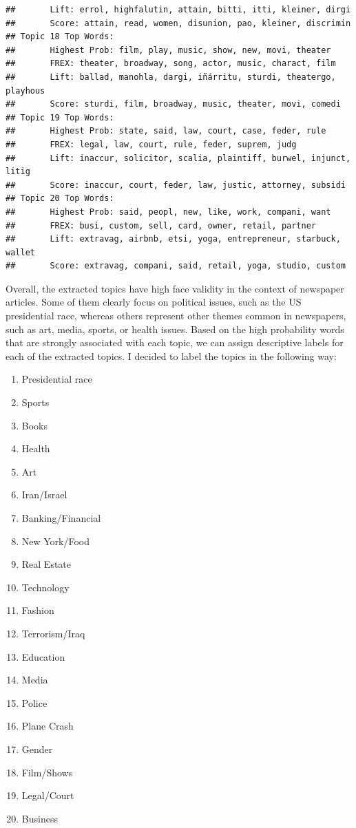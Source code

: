 \documentclass[12pt]{article}\usepackage[]{graphicx}\usepackage[]{color}
\makeatletter
\newenvironment{kframe}{%
 \def\at@end@of@kframe{}%
 \ifinner\ifhmode%
  \def\at@end@of@kframe{\end{minipage}}%
  \begin{minipage}{\columnwidth}%
 \fi\fi%
 \def\FrameCommand##1{\hskip\@totalleftmargin \hskip-\fboxsep
 \colorbox{shadecolor}{##1}\hskip-\fboxsep
     \hskip-\linewidth \hskip-\@totalleftmargin \hskip\columnwidth}%
 \MakeFramed {\advance\hsize-\width
   \@totalleftmargin\z@ \linewidth\hsize
   \@setminipage}}%
 {\par\unskip\endMakeFramed%
 \at@end@of@kframe}
\newenvironment{knitrout}{}{} %
\makeatother
\begin{document}
\begin{knitrout}
\begin{kframe}
\begin{verbatim}
##  	 Lift: errol, highfalutin, attain, bitti, itti, kleiner, dirgi 
##  	 Score: attain, read, women, disunion, pao, kleiner, discrimin 
## Topic 18 Top Words:
##  	 Highest Prob: film, play, music, show, new, movi, theater 
##  	 FREX: theater, broadway, song, actor, music, charact, film 
##  	 Lift: ballad, manohla, dargi, iñárritu, sturdi, theatergo, playhous 
##  	 Score: sturdi, film, broadway, music, theater, movi, comedi 
## Topic 19 Top Words:
##  	 Highest Prob: state, said, law, court, case, feder, rule 
##  	 FREX: legal, law, court, rule, feder, suprem, judg 
##  	 Lift: inaccur, solicitor, scalia, plaintiff, burwel, injunct, litig 
##  	 Score: inaccur, court, feder, law, justic, attorney, subsidi 
## Topic 20 Top Words:
##  	 Highest Prob: said, peopl, new, like, work, compani, want 
##  	 FREX: busi, custom, sell, card, owner, retail, partner 
##  	 Lift: extravag, airbnb, etsi, yoga, entrepreneur, starbuck, wallet 
##  	 Score: extravag, compani, said, retail, yoga, studio, custom
\end{verbatim}
\end{kframe}
\end{knitrout}

Overall, the extracted topics have high face validity in the context of newspaper articles. Some of them clearly focus on political issues, such as the US presidential race, whereas others represent other themes common in newspapers, such as art, media, sports, or health issues. Based on the high probability words that are strongly associated with each topic, we can assign descriptive labels for each of the extracted topics. I decided to label the topics in the following way: 
\begin{enumerate}
\item Presidential race
\item Sports
\item Books
\item Health
\item Art
\item Iran/Israel
\item Banking/Financial
\item New York/Food
\item Real Estate
\item Technology
\item Fashion
\item Terrorism/Iraq
\item Education
\item Media
\item Police
\item Plane Crash
\item Gender
\item Film/Shows
\item Legal/Court
\item Business
\end{enumerate}
\end{document}
